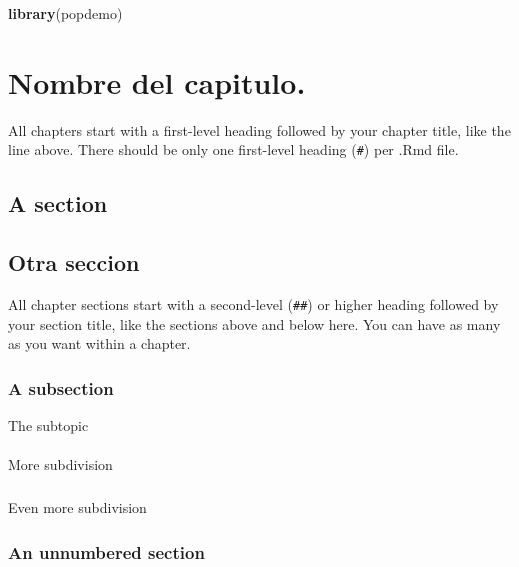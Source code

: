 \documentclass[
]{book}
\newenvironment{Shaded}{\begin{snugshade}}{\end{snugshade}}
\newcommand{\FunctionTok}[1]{\textcolor[rgb]{0.13,0.29,0.53}{\textbf{#1}}}
\newcommand{\NormalTok}[1]{#1}
\theoremstyle{definition}
\theoremstyle{definition}
\theoremstyle{definition}
\theoremstyle{definition}
\theoremstyle{remark}
\begin{document}
\begin{Shaded}
\begin{Highlighting}[]
\FunctionTok{library}\NormalTok{(popdemo)}
\end{Highlighting}
\end{Shaded}

\chapter{Nombre del capitulo.}\label{intro}

All chapters start with a first-level heading followed by your chapter title, like the line above. There should be only one first-level heading (\texttt{\#}) per .Rmd file.

\section{A section}\label{a-section}

\section{Otra seccion}\label{otra-seccion}

All chapter sections start with a second-level (\texttt{\#\#}) or higher heading followed by your section title, like the sections above and below here. You can have as many as you want within a chapter.

\subsection*{A subsection}\label{a-subsection}

The subtopic

\subsubsection{}\label{section-1}

More subdivision

\paragraph{}\label{section-2}

Even more subdivision

\subsection*{An unnumbered section}\label{an-unnumbered-section}
\end{document}
